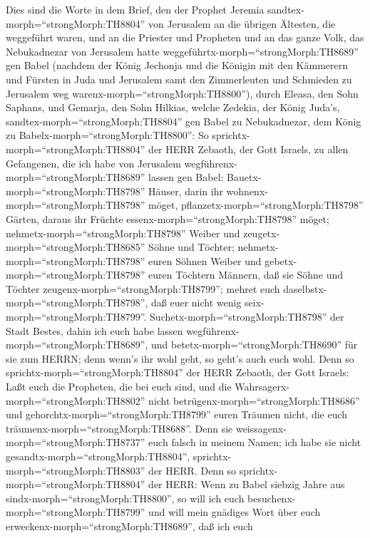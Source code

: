  Dies sind die Worte in dem Brief, den der Prophet Jeremia
sandtex-morph=``strongMorph:TH8804'' von Jerusalem an die übrigen
Ältesten, die weggeführt waren, und an die Priester und Propheten und an
das ganze Volk, das Nebukadnezar von Jerusalem hatte
weggeführtx-morph=``strongMorph:TH8689'' gen Babel  (nachdem
der König Jechonja und die Königin mit den Kämmerern und Fürsten in Juda
und Jerusalem samt den Zimmerleuten und Schmieden zu Jerusalem weg
warenx-morph=``strongMorph:TH8800''),  durch Eleasa, den
Sohn Saphans, und Gemarja, den Sohn Hilkias, welche Zedekia, der König
Juda's, sandtex-morph=``strongMorph:TH8804'' gen Babel zu Nebukadnezar,
dem König zu Babelx-morph=``strongMorph:TH8800'':  So
sprichtx-morph=``strongMorph:TH8804'' der HERR Zebaoth, der Gott
Israels, zu allen Gefangenen, die ich habe von Jerusalem
wegführenx-morph=``strongMorph:TH8689'' lassen gen Babel: 
Bauetx-morph=``strongMorph:TH8798'' Häuser, darin ihr
wohnenx-morph=``strongMorph:TH8798'' möget,
pflanzetx-morph=``strongMorph:TH8798'' Gärten, daraus ihr Früchte
essenx-morph=``strongMorph:TH8798'' möget; 
nehmetx-morph=``strongMorph:TH8798'' Weiber und
zeugetx-morph=``strongMorph:TH8685'' Söhne und Töchter;
nehmetx-morph=``strongMorph:TH8798'' euren Söhnen Weiber und
gebetx-morph=``strongMorph:TH8798'' euren Töchtern Männern, daß sie
Söhne und Töchter zeugenx-morph=``strongMorph:TH8799''; mehret euch
daselbstx-morph=``strongMorph:TH8798'', daß euer nicht wenig
seix-morph=``strongMorph:TH8799''. 
Suchetx-morph=``strongMorph:TH8798'' der Stadt Bestes, dahin ich euch
habe lassen wegführenx-morph=``strongMorph:TH8689'', und
betetx-morph=``strongMorph:TH8690'' für sie zum HERRN; denn wenn's ihr
wohl geht, so geht's auch euch wohl.  Denn so
sprichtx-morph=``strongMorph:TH8804'' der HERR Zebaoth, der Gott
Israels: Laßt euch die Propheten, die bei euch sind, und die
Wahrsagerx-morph=``strongMorph:TH8802'' nicht
betrügenx-morph=``strongMorph:TH8686'' und
gehorchtx-morph=``strongMorph:TH8799'' euren Träumen nicht, die euch
träumenx-morph=``strongMorph:TH8688''.  Denn sie
weissagenx-morph=``strongMorph:TH8737'' euch falsch in meinem Namen; ich
habe sie nicht gesandtx-morph=``strongMorph:TH8804'',
sprichtx-morph=``strongMorph:TH8803'' der HERR.  Denn so
sprichtx-morph=``strongMorph:TH8804'' der HERR: Wenn zu Babel siebzig
Jahre aus sindx-morph=``strongMorph:TH8800'', so will ich euch
besuchenx-morph=``strongMorph:TH8799'' und will mein gnädiges Wort über
euch erweckenx-morph=``strongMorph:TH8689'', daß ich euch
